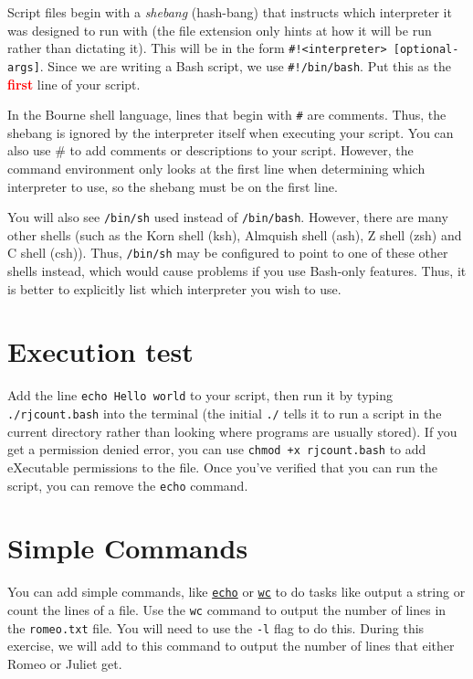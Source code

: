 \documentclass[12pt]{article}
\newcommand{\code}[1]{\texttt{#1}}
\newcommand{\filename}{\code{rjcount.bash}\xspace}
\begin{document}
Script files begin with a \emph{shebang} (hash-bang) that instructs which interpreter it was designed to run with (the file extension only hints at how it will be run rather than dictating it).
This will be in the form \code{\#!<interpreter> [optional-args]}.
Since we are writing a Bash script, we use \code{\#!/bin/bash}.
Put this as the \textbf{\textcolor{red}{first}} line of your script.

In the Bourne shell language, lines that begin with \code{\#} are comments.
Thus, the shebang is ignored by the interpreter itself when executing your script.
You can also use \# to add comments or descriptions to your script.
However, the command environment only looks at the first line when determining which interpreter to use, so the shebang must be on the first line.


You will also see \code{/bin/sh} used instead of \code{/bin/bash}.
However, there are many other shells (such as the Korn shell (ksh), Almquish shell (ash), Z shell (zsh) and C shell (csh)).
Thus, \code{/bin/sh} may be configured to point to one of these other shells instead, which would cause problems if you use Bash-only features.
Thus, it is better to explicitly list which interpreter you wish to use.

\section*{Execution test}
Add the line \code{echo Hello world} to your script, then run it by typing \code{./\filename} into the terminal 
(the initial \code{./} tells it to run a script in the current directory rather than looking where programs are usually stored).
If you get a permission denied error, you can use \code{chmod +x \filename} to add eXecutable permissions to the file.
Once you've verified that you can run the script, you can remove the \code{echo} command.

\section*{Simple Commands}
You can add simple commands, like \href{https://en.wikipedia.org/wiki/Echo_(command)}{\code{echo}} or \href{https://en.wikipedia.org/wiki/Wc_(Unix)}{\code{wc}} to do tasks like output a string or count the lines of a file.
Use the \code{wc} command to output the number of lines in the \code{romeo.txt} file.
You will need to use the \code{-l} flag to do this.
During this exercise, we will add to this command to output the number of lines that either Romeo or Juliet get.
\end{document}
